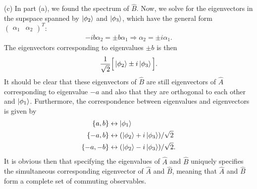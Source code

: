 {(c) In part (a), we found the spectrum of $\hat{B}$.
Now, we solve for the eigenvectors in the supspace spanned by $\ket{\phi_2}$ and $\ket{\phi_3}$, which have the general form $\begin{pmatrix} \alpha_1 & \alpha_2 \end{pmatrix}^{T}$:
\begin{eqnarray}
    -ib \alpha_2 = \pm b \alpha_1 \Rightarrow \alpha_2 = \pm i \alpha_1
.\end{eqnarray}
The eigenvectors corresponding to eigenvalues $\pm b$ is then 
\begin{eqnarray}
    \frac{1}{\sqrt{2}} \Big[ \ket{\phi_2} \pm i \ket{\phi_3} \Big]
.\end{eqnarray}
It should be clear that these eigenvectors of $\hat{B}$ are still eigenvectors of $\hat{A}$ corresponding to eigenvalue $-a$ and also that they are orthogonal to each other and $\ket{\phi_1}$.
Furthermore, the correspondence between eigenvalues and eigenvectors is given by
\begin{align}
    \{ a,b \} &\leftrightarrow \ket{\phi_1} \\
    \{ -a, b \}  &\leftrightarrow (\ket{\phi_2} + i \ket{\phi_3})/\sqrt{2} \\
    \{ -a,-b \}  &\leftrightarrow (\ket{\phi_2} - i\ket{\phi_3})/\sqrt{2}
.\end{align}
It is obvious then that specifying the eigenvalues of $\hat{A}$ and $\hat{B}$ uniquely specifies the simultaneous corresponding eigenvector of $\hat{A}$ and $\hat{B}$, meaning that $\hat{A}$ and $\hat{B}$ form a complete set of commuting observables.


}



